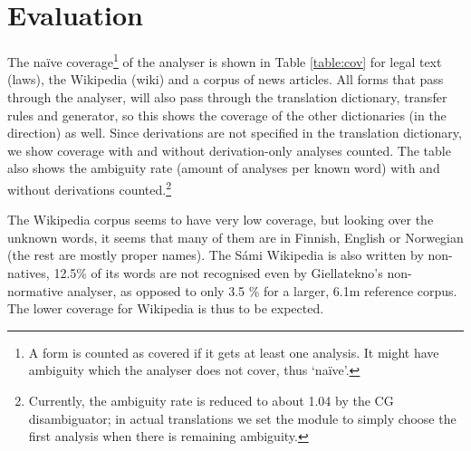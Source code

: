 \documentclass{book}
\begin{document}
\section{Evaluation}
\label{sec:eval}
The na\"{i}ve coverage\footnote{A form is counted as covered if it
  gets at least one analysis. It might have ambiguity which the
  analyser does not cover, thus `na\"{i}ve'.} of the analyser is shown
in Table \ref{table:cov} for legal text (laws), the \sme{} Wikipedia
(wiki) and a corpus of \sme{} news articles. All forms that pass
through the analyser, will also pass through the translation
dictionary, transfer rules and generator, so this shows the coverage
of the other dictionaries (in the \smenob{} direction) as well. Since
derivations are not specified in the translation dictionary, we show
coverage with and without derivation-only analyses counted. The table
also shows the ambiguity rate (amount of analyses per known word) with
and without derivations counted.\footnote{Currently, the ambiguity
  rate is reduced to about 1.04 by the CG disambiguator; in actual
  translations we set the module to simply choose the first analysis
  when there is remaining ambiguity.}


The Wikipedia corpus seems to have very low coverage, but looking over
the unknown words, it seems that many of them are in Finnish, English
or Norwegian (the rest are mostly proper names). The S\'{a}mi Wikipedia
is also written by non-natives, 12.5\% of its words are not recognised
even by Giellatekno's non-normative analyser, as opposed to only 3.5 \% for
a larger, 6.1m reference corpus. The lower coverage for Wikipedia is thus to
be expected.
\end{document}
